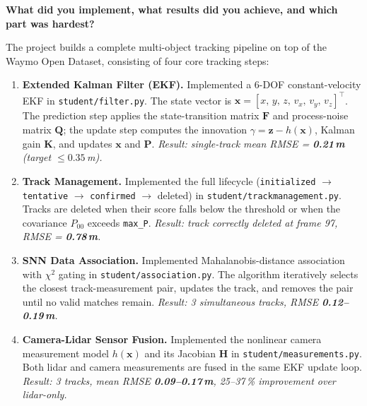 \documentclass[12pt, a4paper]{article}
\begin{document}
\textbf{What did you implement, what results did you achieve, and which part was hardest?}

\medskip

The project builds a complete multi-object tracking pipeline on top of the Waymo Open Dataset,
consisting of four core tracking steps:

\begin{enumerate}[leftmargin=1.8em, itemsep=4pt]

  \item \textbf{Extended Kalman Filter (EKF).}
  Implemented a 6-DOF constant-velocity EKF in \texttt{student/filter.py}.
  The state vector is $\mathbf{x} = [x,\, y,\, z,\, v_x,\, v_y,\, v_z]^\top$.
  The prediction step applies the state-transition matrix $\mathbf{F}$ and process-noise
  matrix $\mathbf{Q}$; the update step computes the innovation $\gamma = \mathbf{z} - h(\mathbf{x})$,
  Kalman gain $\mathbf{K}$, and updates $\mathbf{x}$ and $\mathbf{P}$.
  \textit{Result: single-track mean RMSE = \textbf{0.21\,m} (target $\leq 0.35$\,m).}

  \item \textbf{Track Management.}
  Implemented the full lifecycle (\texttt{initialized} $\to$ \texttt{tentative} $\to$
  \texttt{confirmed} $\to$ deleted) in \texttt{student/trackmanagement.py}.
  Tracks are deleted when their score falls below the threshold or
  when the covariance $P_{00}$ exceeds \texttt{max\_P}.
  \textit{Result: track correctly deleted at frame 97, RMSE = \textbf{0.78\,m}.}

  \item \textbf{SNN Data Association.}
  Implemented Mahalanobis-distance association with $\chi^2$ gating in
  \texttt{student/association.py}. The algorithm iteratively selects the closest
  track-measurement pair, updates the track, and removes the pair until no valid
  matches remain.
  \textit{Result: 3 simultaneous tracks, RMSE \textbf{0.12--0.19\,m}.}

  \item \textbf{Camera-Lidar Sensor Fusion.}
  Implemented the nonlinear camera measurement model $h(\mathbf{x})$ and its
  Jacobian $\mathbf{H}$ in \texttt{student/measurements.py}.
  Both lidar and camera measurements are fused in the same EKF update loop.
  \textit{Result: 3 tracks, mean RMSE \textbf{0.09--0.17\,m}, 25--37\,\% improvement over lidar-only.}

\end{enumerate}

\medskip
\end{document}
